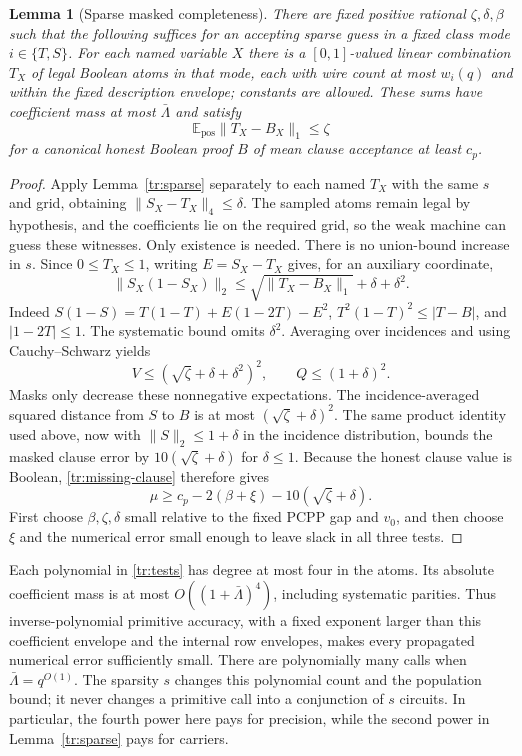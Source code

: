 \documentclass[11pt,letterpaper]{article}
\newtheorem{lemma}[theorem]{Lemma}
\theoremstyle{definition}
\theoremstyle{remark}
\begin{document}
\begin{lemma}[Sparse masked completeness]
\label{tr:completeness}
There are fixed positive rational $\zeta,\delta,\beta$ such that
the following suffices for an accepting sparse guess in a fixed class
mode $i\in\{T,S\}$. For each named variable $X$ there is a
$[0,1]$-valued linear combination $T_X$ of legal Boolean atoms in that
mode, each with wire count at most $w_i(q)$ and within the fixed
description envelope; constants are allowed. These sums have
coefficient mass at most $\bar\Lambda$ and satisfy
\[
 \mathbb E_{\mathrm{pos}}\|T_X-B_X\|_1\le\zeta
\]
for a canonical honest Boolean proof $B$ of mean clause acceptance
at least $c_p$.
\end{lemma}
\begin{proof}
Apply Lemma~\ref{tr:sparse} separately to each named $T_X$ with
the same $s$ and grid, obtaining $\|S_X-T_X\|_4\le\delta$.
The sampled atoms remain legal by hypothesis, and the coefficients
lie on the required grid, so the weak machine can guess these witnesses.
Only existence is needed.
There is no union-bound increase in $s$.
Since $0\le T_X\le1$, writing $E=S_X-T_X$ gives, for an auxiliary
coordinate,
\[
 \|S_X(1-S_X)\|_2
 \le \sqrt{\|T_X-B_X\|_1}+\delta+\delta^2.
\]
Indeed $S(1-S)=T(1-T)+E(1-2T)-E^2$,
$T^2(1-T)^2\le|T-B|$, and $|1-2T|\le1$.
The systematic bound omits $\delta^2$. Averaging over incidences
and using Cauchy--Schwarz yields
\[
 V\le(\sqrt\zeta+\delta+\delta^2)^2,
 \qquad Q\le(1+\delta)^2.
\]
Masks only decrease these nonnegative expectations.
The incidence-averaged squared distance from $S$ to $B$ is at most
$(\sqrt\zeta+\delta)^2$. The same product identity used above,
now with $\|S\|_2\le1+\delta$ in the incidence distribution,
bounds the masked clause error by
$10(\sqrt\zeta+\delta)$ for $\delta\le1$.
Because the honest clause value is Boolean,
\eqref{tr:missing-clause} therefore gives
\[
 \mu\ge c_p-2(\beta+\xi)-10(\sqrt\zeta+\delta).
\]
First choose $\beta,\zeta,\delta$ small relative to the fixed PCPP
gap and $v_0$, and then choose $\xi$ and the numerical error small
enough to leave slack in all three tests.
\end{proof}

Each polynomial in \eqref{tr:tests} has degree at most four in the
atoms. Its absolute coefficient mass is at most
$O((1+\bar\Lambda)^4)$, including systematic parities.
Thus inverse-polynomial primitive accuracy, with a fixed exponent
larger than this coefficient envelope and the internal row envelopes,
makes every propagated numerical error sufficiently small.
There are polynomially many calls when $\bar\Lambda=q^{O(1)}$.
The sparsity $s$ changes this polynomial count and the population
bound; it never changes a primitive call into a conjunction of $s$
circuits. In particular, the fourth power here pays for precision,
while the second power in Lemma~\ref{tr:sparse} pays for carriers.
\end{document}
